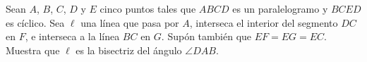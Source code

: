 Sean $A$, $B$, $C$, $D$ y $E$ cinco puntos tales que $ABCD$ es un paralelogramo y $BCED$ es cíclico. Sea $\ell$ una línea que pasa por $A$, interseca el interior del segmento $DC$ en $F$, e interseca a la línea $BC$ en $G$. Supón también que $EF=EG=EC$. Muestra que $\ell$ es la bisectriz del ángulo $\angle DAB$.